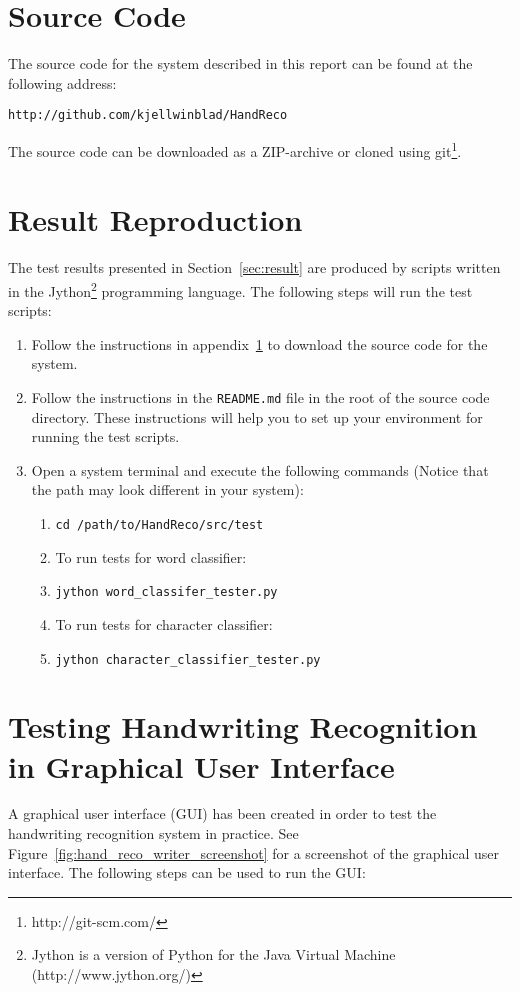 
\section{Source Code}\label{app:source_code}

The source code for the system described in this report can be found at the following address:

\begin{verbatim}
http://github.com/kjellwinblad/HandReco
\end{verbatim}

The source code can be downloaded as a ZIP-archive or cloned using git\footnote{http://git-scm.com/}.

\section{Result Reproduction}\label{app:result_reproduction} 

The test results presented in Section~\ref{sec:result} are produced by scripts written in the Jython\footnote{Jython is a version of Python for the Java Virtual Machine (http://www.jython.org/)} programming language. The following steps will run the test scripts:

\begin{enumerate}
 \item Follow the instructions in appendix~\ref{app:source_code} to download the source code for the system.
 \item Follow the instructions in the \verb|README.md| file in the root of the source code directory. These instructions will help you to set up your environment for running the test scripts.
 \item Open a system terminal and execute the following commands (Notice that the path may look different in your system):
 \begin{enumerate}
  \item \verb|cd /path/to/HandReco/src/test|
  \item To run tests for word classifier:
  \item \verb|jython word_classifer_tester.py|
  \item To run tests for character classifier:
  \item \verb|jython character_classifier_tester.py|
 \end{enumerate}
\end{enumerate}

\section{Testing Handwriting Recognition in Graphical User Interface}
A graphical user interface (GUI) has been created in order to test the handwriting recognition system in practice. See Figure~\ref{fig:hand_reco_writer_screenshot} for a screenshot of the graphical user interface. The following steps can be used to run the GUI:

